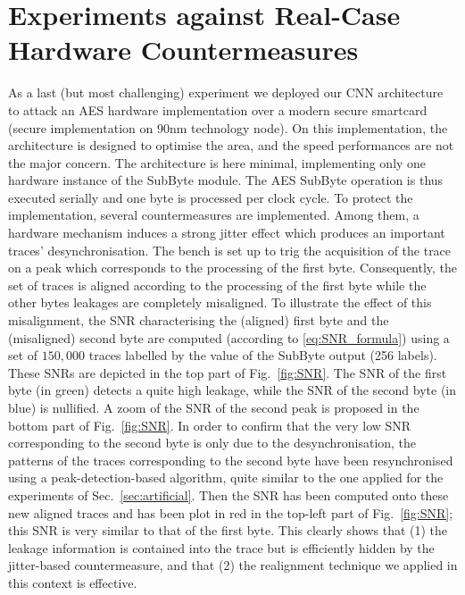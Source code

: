 \section{Experiments against Real-Case Hardware Countermeasures}\label{sec:AES}
As a last (but most challenging) experiment we deployed our CNN architecture to attack an AES hardware implementation over a modern secure smartcard (secure implementation on 90nm technology node). On this implementation, the architecture is designed to optimise the area, and the speed performances are not the major concern. The architecture is here minimal, implementing only one hardware instance of the SubByte module.  The AES SubByte operation is thus executed serially and one byte is processed per clock cycle. To protect the implementation, several countermeasures are implemented.  Among them, a hardware mechanism induces a strong jitter effect which produces an important traces' desynchronisation. The bench is set up to trig the acquisition of the trace on a peak which corresponds to the processing of the first byte. Consequently, the set of traces is aligned according to the processing of the first byte while the other bytes leakages are completely misaligned. To illustrate the effect of this misalignment, the SNR characterising the (aligned) first byte and the (misaligned) second byte are computed (according to \eqref{eq:SNR_formula}) using a set of $150,000$ traces labelled by the value of the SubByte output (256 labels). These SNRs are depicted in the top part of Fig.~\ref{fig:SNR}. The SNR of the first byte (in green) detects a quite high leakage, while the SNR of the second byte (in blue) is nullified. A zoom of the SNR of the second peak is proposed in the bottom part of Fig.~\ref{fig:SNR}. In order to confirm that the very low SNR corresponding to the second byte is only due to the desynchronisation, the patterns of the traces corresponding to the second byte have been resynchronised using a peak-detection-based algorithm, quite similar to the one applied for the experiments of Sec.~\ref{sec:artificial}. Then the SNR has been computed onto these new aligned traces and has been plot in red in the top-left part of Fig.~\ref{fig:SNR}; this SNR is very similar to that of the first byte. This clearly shows that (1) the leakage information is contained into the trace but is efficiently hidden by the jitter-based countermeasure, and that (2) the realignment technique we applied in this context is effective.

